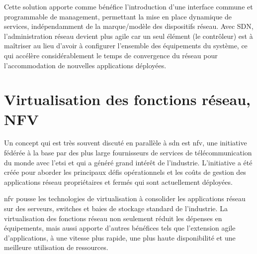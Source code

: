 
Cette solution apporte comme bénéfice l'introduction d'une interface commune et programmable de management, permettant la mise en place dynamique de services, indépendamment de la marque/modèle des dispositifs réseau. Avec SDN, l'administration réseau devient plus agile car un seul élément (le contrôleur) est à maîtriser au lieu d'avoir à configurer l'ensemble des équipements du système, ce qui accélère considérablement le temps de convergence du réseau pour l'accommodation de nouvelles applications déployées. \cite{SDNNewNormONFExecutiveSummary} \cite{ImplementationChallengesForSDNBackground}





\section{Virtualisation des fonctions réseau, NFV}


Un concept qui est très souvent discuté en parallèle à \gls{sdn} est \gls{nfv}, une initiative fédérée à la base par des plus large fournisseurs de services  de télécommunication du monde avec l'\gls{etsi} et qui a généré grand intérêt de l'industrie. L'initiative a été créée pour aborder les principaux défis opérationnels et les coûts de gestion des applications réseau propriétaires et fermés qui sont actuellement déployées.


\gls{nfv} pousse les technologies de virtualisation à consolider les applications réseau sur des serveurs, switches et baies de stockage standard de l'industrie. La virtualisation des fonctions réseau non seulement réduit les dépenses en équipements, mais aussi apporte d'autres bénéfices tels que l'extension agile d'applications, à une vitesse plus rapide, une plus haute disponibilité et une meilleure utilisation de ressources.


